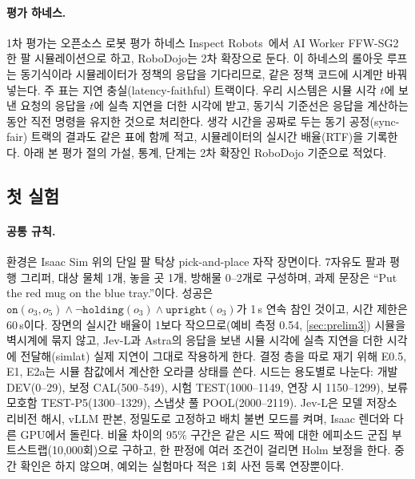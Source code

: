 \paragraph{평가 하네스.}
1차 평가는 오픈소스 로봇 평가 하네스 Inspect Robots~\cite{inspectrobots2026}에서 AI Worker FFW-SG2 한 팔 시뮬레이션으로 하고, RoboDojo는 2차 확장으로 둔다. 이 하네스의 롤아웃 루프는 동기식이라 시뮬레이터가 정책의 응답을 기다리므로, 같은 정책 코드에 시계만 바꿔 넣는다. 주 표는 지연 충실(latency-faithful) 트랙이다. 우리 시스템은 시뮬 시각 $t$에 보낸 요청의 응답을 $t$에 실측 지연을 더한 시각에 받고, 동기식 기준선은 응답을 계산하는 동안 직전 명령을 유지한 것으로 처리한다. 생각 시간을 공짜로 두는 동기 공정(sync-fair) 트랙의 결과도 같은 표에 함께 적고, 시뮬레이터의 실시간 배율(RTF)을 기록한다. 아래 본 평가 절의 가설, 통계, 단계는 2차 확장인 RoboDojo 기준으로 적었다.

\subsection{첫 실험}

\paragraph{공통 규칙.}
환경은 Isaac Sim 위의 단일 팔 탁상 pick-and-place 자작 장면이다. 7자유도 팔과 평행 그리퍼, 대상 물체 1개, 놓을 곳 1개, 방해물 0--2개로 구성하며, 과제 문장은 ``Put the red mug on the blue tray.''이다. 성공은 $\texttt{on}(o_3,o_5)\land\lnot\texttt{holding}(o_3)\land\texttt{upright}(o_3)$가 1\,s 연속 참인 것이고, 시간 제한은 60\,s이다. 장면의 실시간 배율이 1보다 작으므로(예비 측정 0.54, \cref{sec:prelim3}) 시뮬을 벽시계에 묶지 않고, Jev-L과 Astra의 응답을 보낸 시뮬 시각에 실측 지연을 더한 시각에 전달해(simlat) 실제 지연이 그대로 작용하게 한다. 결정 층을 따로 재기 위해 E0.5, E1, E2a는 시뮬 참값에서 계산한 오라클 상태를 쓴다. 시드는 용도별로 나눈다: 개발 DEV(0--29), 보정 CAL(500--549), 시험 TEST(1000--1149, 연장 시 1150--1299), 보류 모호함 TEST-P5(1300--1329), 스냅샷 풀 POOL(2000--2119). Jev-L은 모델 저장소 리비전 해시, vLLM 판본, 정밀도로 고정하고 배치 불변 모드를 켜며, Isaac 렌더와 다른 GPU에서 돌린다. 비율 차이의 95\% 구간은 같은 시드 짝에 대한 에피소드 군집 부트스트랩(10,000회)으로 구하고, 한 판정에 여러 조건이 걸리면 Holm 보정을 한다. 중간 확인은 하지 않으며, 예외는 실험마다 적은 1회 사전 등록 연장뿐이다.


